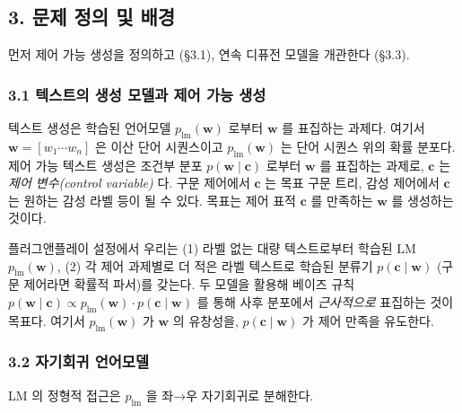 \documentclass[
]{article}
\begin{document}
\hypertarget{uxbb38uxc81c-uxc815uxc758-uxbc0f-uxbc30uxacbd}{%
\subsection{3. 문제 정의 및
배경}\label{uxbb38uxc81c-uxc815uxc758-uxbc0f-uxbc30uxacbd}}

먼저 제어 가능 생성을 정의하고 (§3.1), 연속 디퓨전 모델을 개관한다
(§3.3).

\hypertarget{uxd14duxc2a4uxd2b8uxc758-uxc0dduxc131-uxbaa8uxb378uxacfc-uxc81cuxc5b4-uxac00uxb2a5-uxc0dduxc131}{%
\subsubsection{3.1 텍스트의 생성 모델과 제어 가능
생성}\label{uxd14duxc2a4uxd2b8uxc758-uxc0dduxc131-uxbaa8uxb378uxacfc-uxc81cuxc5b4-uxac00uxb2a5-uxc0dduxc131}}

텍스트 생성은 학습된 언어모델 \(p_\text{lm}(\mathbf{w})\) 로부터
\(\mathbf{w}\) 를 표집하는 과제다. 여기서
\(\mathbf{w} = [w_1 \cdots w_n]\) 은 이산 단어 시퀀스이고
\(p_\text{lm}(\mathbf{w})\) 는 단어 시퀀스 위의 확률 분포다. 제어 가능
텍스트 생성은 조건부 분포 \(p(\mathbf{w} \mid \mathbf{c})\) 로부터
\(\mathbf{w}\) 를 표집하는 과제로, \(\mathbf{c}\) 는 \emph{제어
변수(control variable)} 다. 구문 제어에서 \(\mathbf{c}\) 는 목표 구문
트리, 감성 제어에서 \(\mathbf{c}\) 는 원하는 감성 라벨 등이 될 수 있다.
목표는 제어 표적 \(\mathbf{c}\) 를 만족하는 \(\mathbf{w}\) 를 생성하는
것이다.

플러그앤플레이 설정에서 우리는 (1) 라벨 없는 대량 텍스트로부터 학습된 LM
\(p_\text{lm}(\mathbf{w})\), (2) 각 제어 과제별로 더 적은 라벨 텍스트로
학습된 분류기 \(p(\mathbf{c} \mid \mathbf{w})\) (구문 제어라면 확률적
파서)를 갖는다. 두 모델을 활용해 베이즈 규칙
\(p(\mathbf{w} \mid \mathbf{c}) \propto p_\text{lm}(\mathbf{w}) \cdot p(\mathbf{c} \mid \mathbf{w})\)
를 통해 사후 분포에서 \emph{근사적으로} 표집하는 것이 목표다. 여기서
\(p_\text{lm}(\mathbf{w})\) 가 \(\mathbf{w}\) 의 유창성을,
\(p(\mathbf{c} \mid \mathbf{w})\) 가 제어 만족을 유도한다.

\hypertarget{uxc790uxae30uxd68cuxadc0-uxc5b8uxc5b4uxbaa8uxb378}{%
\subsubsection{3.2 자기회귀
언어모델}\label{uxc790uxae30uxd68cuxadc0-uxc5b8uxc5b4uxbaa8uxb378}}

LM 의 정형적 접근은 \(p_\text{lm}\) 을 좌→우 자기회귀로 분해한다.
\end{document}
